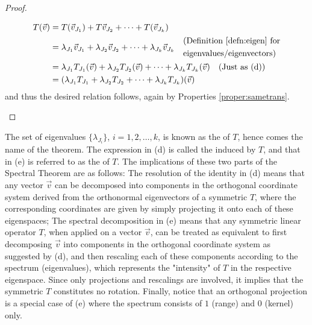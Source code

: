 \begin{proof}
\begin{enumerate}[label=(\alph*)]
\begin{align*}
T(\vec{v}) &= T(\vec{v}_{J_1}) + T\vec{v}_{J_2} + \cdots + T(\vec{v}_{J_k}) \\
&= \lambda_{J_1}\vec{v}_{J_1} + \lambda_{J_2}\vec{v}_{J_2} + \cdots + \lambda_{J_k}\vec{v}_{J_k} \quad \begin{aligned}
&\text{(Definition \ref{defn:eigen} for} \\
&\text{eigenvalues/eigenvectors)}
\end{aligned} \\
&= \lambda_{J_1}T_{J_1}(\vec{v}) + \lambda_{J_2}T_{J_2}(\vec{v}) + \cdots + \lambda_{J_k}T_{J_k}(\vec{v}) \text{\quad (Just as (d))} \\
&= (\lambda_{J_1}T_{J_1} + \lambda_{J_2}T_{J_2} + \cdots + \lambda_{J_k}T_{J_k})(\vec{v})
\end{align*}
and thus the desired relation follows, again by Properties \ref{proper:sametrans}.
\end{enumerate}
\end{proof}
The set of eigenvalues $\{\lambda_{J_i}\}$, $i = 1,2,\ldots,k$, is known as the  of $T$, hence comes the name of the theorem. The expression in (d) is called the  induced by $T$, and that in (e) is referred to as the  of $T$. The implications of these two parts of the Spectral Theorem are as follows: The resolution of the identity in (d) means that any vector $\vec{v}$ can be decomposed into components in the orthogonal coordinate system derived from the orthonormal eigenvectors of a symmetric $T$, where the corresponding coordinates are given by simply projecting it onto each of these eigenspaces; The spectral decomposition in (e) means that any symmetric linear operator $T$, when applied on a vector $\vec{v}$, can be treated as equivalent to first decomposing $\vec{v}$ into components in the orthogonal coordinate system as suggested by (d), and then rescaling each of these components according to the spectrum (eigenvalues), which represents the "intensity" of $T$ in the respective eigenspace. Since only projections and rescalings are involved, it implies that the symmetric $T$ constitutes no rotation. Finally, notice that an orthogonal projection is a special case of (e) where the spectrum consists of $1$ (range) and $0$ (kernel) only.\par

